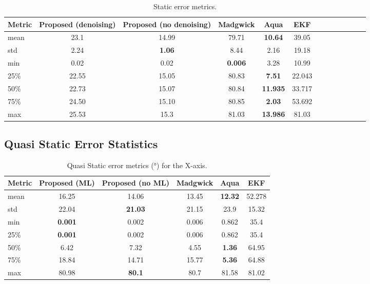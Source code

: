 \documentclass{iutbscthesis}
\begin{document}
\begin{table}[H]
\centering
\caption{Static error metrics.}\label{tab:static_ml}
\begin{tabular}{l
  *{4}{ccc}
}
\toprule
Metric & Proposed (denoising) & Proposed (no denoising) & Madgwick & Aqua & EKF \\
\midrule
mean & 23.1 & 14.99 & 79.71 & \textbf{10.64} & 39.05  \\
std & 2.24 & \textbf{1.06} & 8.44 & 2.16 & 19.18  \\
min & 0.02 & 0.02 & \textbf{0.006} & 3.28 & 10.99  \\
25\% & 22.55 & 15.05 & 80.83 & \textbf{7.51} & 22.043  \\
50\% & 22.73 & 15.07  & 80.84 & \textbf{11.935} & 33.717  \\
75\% & 24.50 & 15.10 & 80.85 & \textbf{2.03} & 53.692  \\
max & 25.53 & 15.3 & 81.03 & \textbf{13.986} & 81.03  \\
\bottomrule
\end{tabular}
\end{table}


\subsection{Quasi Static Error Statistics}

\begin{table}[H]
\centering
\scriptsize
\caption{Quasi Static error metrics (°) for the X-axis.}
\label{tab:quasi_x}
\begin{tabular}{lccccc}
\toprule
Metric & Proposed (ML) & Proposed (no ML) & Madgwick & Aqua & EKF \\
\midrule
mean & 16.25 & 14.06 & 13.45 & \textbf{12.32} & 52.278 \\
std & 22.04 & \textbf{21.03} & 21.15 & 23.9 & 15.32 \\
min & \textbf{0.001} & 0.002 & 0.006 & 0.862 & 35.4 \\
25\% & \textbf{0.001} & 0.002 & 0.006 & 0.862 & 35.4 \\
50\% & 6.42 & 7.32 & 4.55 & \textbf{1.36} & 64.95 \\
75\% & 18.84 & 14.71 & 15.77 & \textbf{5.36} & 64.88 \\
max & 80.98 & \textbf{80.1} & 80.7 & 81.58 & 81.02 \\
\bottomrule
\end{tabular}
\end{table}
\end{document}
